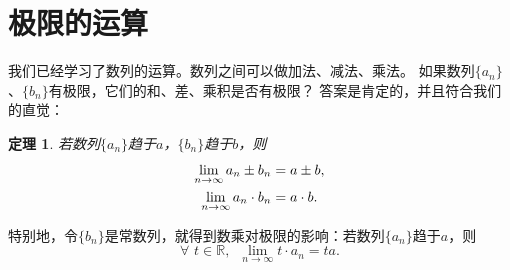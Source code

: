 \documentclass[12pt,UTF8]{ctexbook}
\newtheorem{tm}{定理}[section]
\begin{document}
\section{极限的运算}
我们已经学习了数列的运算。数列之间可以做加法、减法、乘法。
如果数列$\{a_n\}$、$\{b_n\}$有极限，它们的和、差、乘积是否有极限？
答案是肯定的，并且符合我们的直觉：
\begin{tm}
    若数列$\{a_n\}$趋于$a$，$\{b_n\}$趋于$b$，则
    \begin{align}
        \lim_{n\to\infty} a_n \pm b_n &= a \pm b, \notag \\
        \lim_{n\to\infty} a_n \cdot b_n &= a \cdot b. \notag 
    \end{align}
\end{tm}
特别地，令$\{b_n\}$是常数列，就得到数乘对极限的影响：若数列$\{a_n\}$趋于$a$，则
$$ \forall \,\, t \in \mathbb{R}, \,\,\,  \lim_{n\to\infty} t \cdot a_n = ta. $$
\end{document}
